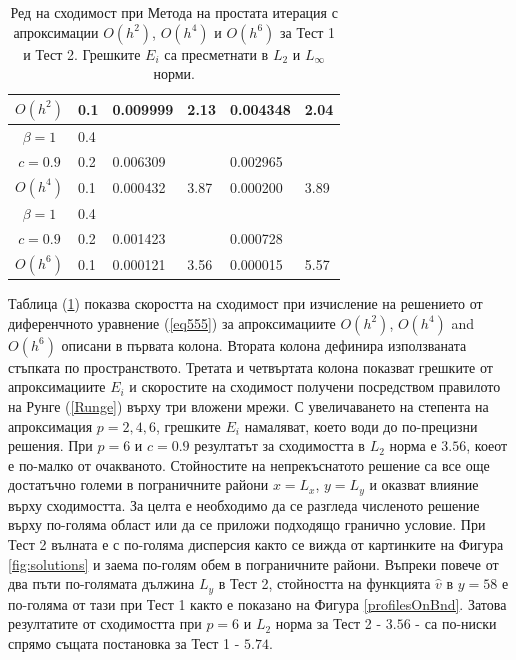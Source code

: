 \documentclass{article}
\newcommand{\rf}[1]{(\ref{#1})}
\begin{document}
\begin{table}[ht]
\begin{tabular}{||c|l|ll|ll||}
     $O(h^2)$	&0.1  & 0.009999 & 2.13       & 0.004348      & 2.04  \\
\hline 	
 $\beta = 1$   	&0.4  &            &               &               &     \\
     $c=0.9$  	&0.2   & 0.006309  &              & 0.002965      &        \\
     $O(h^4)$	&0.1  &  0.000432 &3.87        & 0.000200 &  3.89        \\
    \hline
 $\beta = 1$	&0.4   &             &        &               &        \\
   $ c=0.9$  	&0.2   &  0.001423  &        & 0.000728      &       \\
       $O(h^6)$	&0.1  &   0.000121 &3.56  & 0.000015 &   5.57       \\
	   \hline
			\hline 
		\end{tabular}
		\caption{Ред на сходимост при Метода на простата итерация с апроксимации $O(h^{2})$, $O(h^{4})$ и $O(h^{6})$ за Тест  1 и Тест 2. Грешките $E_i$ са пресметнати в $L_2$ и $L_\infty$ норми.}
\label{tab:a}
\end{table}
\FloatBarrier
Таблица \rf{tab:a} показва скоростта на сходимост при изчисление на решението от диференчното уравнение \rf{eq555} за апроксимациите $O(h^{2})$, $O(h^{4})$ and $O(h^{6})$ описани в първата колона. Втората колона дефинира използваната стъпката по пространството. Третата и четвъртата колона показват грешките от апроксимациите $E_i$ и скоростите на сходимост получени посредством правилото на Рунге \rf{Runge} върху три вложени мрежи. С увеличаването на степента на апроксимация $p=2,4,6$, грешките $E_i$ намаляват, което води до по-прецизни решения. При $p=6$ и $c=0.9$ резултатът за сходимостта в $L_2$ норма е $3.56$, коеот е по-малко от очакваното. Стойностите на непрекъснатото решение са все още достатъчно големи в пограничните райони $x=L_x$, $y=L_y$ и оказват влияние върху сходимостта. За целта е необходимо да се разгледа численото решение върху по-голяма област или да се приложи подходящо гранично условие.  При Тест 2 вълната е с по-голяма дисперсия както се вижда от картинките на Фигура \ref{fig:solutions} и заема по-голям обем в пограничните райони. Въпреки повече от два пъти по-голямата дължина $L_y$ в Тест 2, стойността на функцията $\widehat v$ в $y=58$ е по-голяма от тази при Тест 1 както е показано на Фигура \ref{profilesOnBnd}. Затова резултатите от сходимостта при $p=6$ и $L_2$ норма за Тест 2 - $3.56$ - са по-ниски спрямо същата постановка за Тест 1 - $5.74$.
\end{document}
